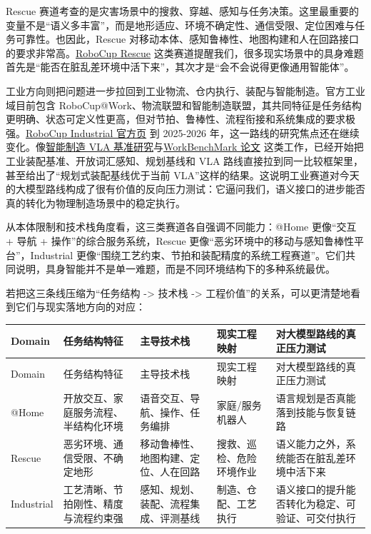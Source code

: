 Rescue 赛道考查的是灾害场景中的搜救、穿越、感知与任务决策。这里最重要的变量不是“语义多丰富”，而是地形适应、环境不确定性、通信受限、定位困难与任务可靠性。也因此，Rescue 对移动本体、感知鲁棒性、地图构建和人在回路接口的要求非常高。\href{https://www.robocup.org/domains/2}{RoboCup Rescue} 这类赛道提醒我们，很多现实场景中的具身难题首先是“能否在脏乱差环境中活下来”，其次才是“会不会说得更像通用智能体”。

工业方向则把问题进一步拉回到工业物流、仓内执行、装配与智能制造。官方工业域目前包含 RoboCup@Work、物流联盟和智能制造联盟，其共同特征是任务结构更明确、状态可定义性更高，但对节拍、鲁棒性、流程衔接和系统集成的要求极强。\href{https://www.robocup.org/domains/4}{RoboCup Industrial 官方页} 到 2025-2026 年，这一路线的研究焦点还在继续变化。像\href{https://arxiv.org/abs/2507.11402}{智能制造 VLA 基准研究}与\href{https://arxiv.org/abs/2606.19358}{WorkBenchMark 论文} 这类工作，已经开始把工业装配基准、开放词汇感知、规划基线和 VLA 路线直接拉到同一比较框架里，甚至给出了“规划式装配基线优于当前 VLA”这样的结果。这说明工业赛道对今天的大模型路线构成了很有价值的反向压力测试：它逼问我们，语义接口的进步能否真的转化为物理制造场景中的稳定执行。

从本体限制和技术栈角度看，这三类赛道各自强调不同能力：@Home 更像“交互 + 导航 + 操作”的综合服务系统，Rescue 更像“恶劣环境中的移动与感知鲁棒性平台”，Industrial 更像“围绕工艺约束、节拍和装配精度的系统工程赛道”。它们共同说明，具身智能并不是单一难题，而是不同环境结构下的多种系统最优。

若把这三条线压缩为“任务结构 -> 技术栈 -> 工程价值”的关系，可以更清楚地看到它们与现实落地方向的对应：

\begingroup
\small
\begin{xltabular}{\textwidth}{YYYYY}
\toprule
Domain & 任务结构特征 & 主导技术栈 & 现实工程映射 & 对大模型路线的真正压力测试 \\
\midrule
\endfirsthead
\toprule
Domain & 任务结构特征 & 主导技术栈 & 现实工程映射 & 对大模型路线的真正压力测试 \\
\midrule
\endhead
@Home & 开放交互、家庭服务流程、半结构化环境 & 语音交互、导航、操作、任务编排 & 家庭/服务机器人 & 语言规划是否真能落到技能与恢复链路 \\
Rescue & 恶劣环境、通信受限、不确定地形 & 移动鲁棒性、地图构建、定位、人在回路 & 搜救、巡检、危险环境作业 & 语义能力之外，系统能否在脏乱差环境中活下来 \\
Industrial & 工艺清晰、节拍刚性、精度与流程约束强 & 感知、规划、装配、流程集成、评测基线 & 制造、仓配、工艺执行 & 语义接口的提升能否转化为稳定、可验证、可交付执行 \\
\bottomrule
\end{xltabular}
\endgroup

